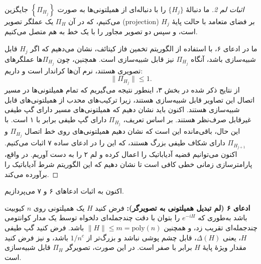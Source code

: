 \begin{proof}[اثبات لم 2]
	ما دنبالهٔ
	 $\{H_j\}$ 
	را با دنباله‌ای از همیلتونی‌ها به صورت
	$\left\{ {{\Pi _{{H_j}}}} \right\}$ 
	جایگزین می‌کنیم، که در آن $\Pi_H$ یک عملگر تصویر (projection) بر فضای متعامد با حالت پایهٔ $H_j$ است، و سپس دو تصویر مجاور را با یک خط به هم متصل می‌کنیم.
	
	ما در ادعای ۶، با استفاده از الگوریتم تخمین فاز کیتائف، نشان می‌دهیم که اگر $H_j$ قابل شبیه‌سازی باشد، آنگاه $\Pi_{H_j}$ نیز قابل شبیه‌سازی است. همچنین، چون $\Pi_{H_j}$‌ها عملگرهای تصویری هستند، نرم آن‌ها کراندار است و داریم:  
	\[
	\|\Pi_{H_j}\| \le 1.
	\]
	از نتایج ذکر شده در بخش ۳، اینطور نتیجه می‌گیریم که تمام همیلتونی‌ها در مسیر اتصال این تصاویر قابل شبیه‌سازی هستند، زیرا ترکیب‌های محدب از همیلتونی‌های قابل شبیه‌سازی هستند.  
	اکنون باید نشان دهیم که همیلتونی‌های مسیر دارای گپ طیفی غیرقابل صرف‌نظر هستند. بر اساس تعریف، $\Pi_{H_j}$ دارای گپ طیفی برابر با ۱ است. با این حال، باقی‌مانده این است که نشان دهیم همیلتونی‌های روی خط اتصال $\Pi_{H_j}$ و $\Pi_{H_{j+1}}$ دارای شکاف طیفی بزرگ هستند، که این را در ادعای ساده ۷ اثبات می‌کنیم.  
	اکنون می‌توانیم قضیه آدیاباتیک را اعمال کرده و لم ۲ را به دست آوریم. در واقع، پارامترسازی زمانی خطی کافی است تا نشان دهیم که این الگوریتم شرط آدیاباتیک را برآورده می‌کند.
\end{proof}
اکنون به اثبات ادعاهای ۶ و ۷ می‌پردازیم.  

\textbf{ادعای ۶ (لم تبدیل همیلتونی به تصویرگر):}  
فرض کنید $H$ یک همیلتونی روی $n$ کیوبیت باشد به‌طوری که $e^{-iH}$ را بتوان با دقت چندجمله‌ای دلخواه توسط یک مدار کوانتومی چندجمله‌ای تقریب زد، و همچنین $\|H\| \le m = \text{poly}(n)$ باشد.  
فرض کنید گپ طیفی $H$، یعنی $\Delta(H)$، قابل چشم پوشی نباشد و بزرگ‌تر از $1/n^c$ باشد، و نیز فرض کنید مقدار ویژهٔ پایهٔ $H$ برابر با صفر است.  
در این صورت، تصویرگر $\Pi_H$ قابل شبیه‌سازی است.

